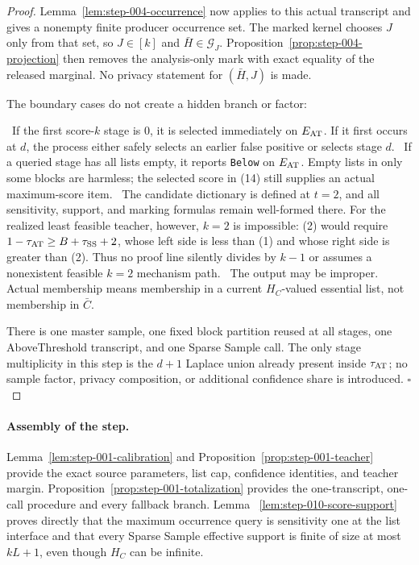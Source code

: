 \begin{proof}
Lemma~\ref{lem:step-004-occurrence} now applies to this actual
transcript and gives a nonempty finite producer occurrence set. The marked
kernel chooses \(J\) only from that set, so \(J\in[k]\) and
\(\bar H\in\mathcal G_J\). Proposition~\ref{prop:step-004-projection} then removes the analysis-only
mark with exact equality of the released marginal. No privacy statement for
\((\bar H,J)\) is made.

The boundary cases do not create a hidden branch or factor:

\noindent\textbullet\ If the first score-\(k\) stage is \(0\), it is selected immediately on
  \(E_{\rm AT}\). If it first occurs at \(d\), the process either safely
  selects an earlier false positive or selects stage \(d\).
\noindent\textbullet\ If a queried stage has all lists empty, it reports \texttt{Below} on
  \(E_{\rm AT}\). Empty lists in only some blocks are harmless; the selected
  score in (14) still supplies an actual maximum-score item.
\noindent\textbullet\ The candidate dictionary is defined at \(t=2\), and all sensitivity,
  support, and marking formulas remain well-formed there. For the realized
  least feasible teacher, however, \(k=2\) is impossible: (2) would require
  \(1-\tau_{\rm AT}\geq B+\tau_{\rm SS}+2\), whose left side is less than
  (1) and whose right side is greater than (2). Thus no proof line
  silently divides by \(k-1\) or assumes a nonexistent feasible \(k=2\)
  mechanism path.
\noindent\textbullet\ The output may be improper. Actual membership means membership in a
  current \(H_C\)-valued essential list, not membership in \(\bar C\).

There is one master sample, one fixed block partition reused at all stages,
one AboveThreshold transcript, and one Sparse Sample call. The only stage
multiplicity in this step is the \(d+1\) Laplace union already present
inside \(\tau_{\rm AT}\); no sample factor, privacy composition, or
additional confidence share is introduced. \(\square\)


\end{proof}

\paragraph{Assembly of the step.}


Lemma~\ref{lem:step-001-calibration} and
Proposition~\ref{prop:step-001-teacher} provide the exact source parameters,
list cap, confidence identities, and teacher margin. Proposition~\ref{prop:step-001-totalization} provides the one-transcript,
one-call procedure and every fallback branch. Lemma
~\ref{lem:step-010-score-support} proves directly that the maximum
occurrence query is sensitivity one at the list interface and that every
Sparse Sample effective support is finite of size at most \(kL+1\), even
though \(H_C\) can be infinite.

